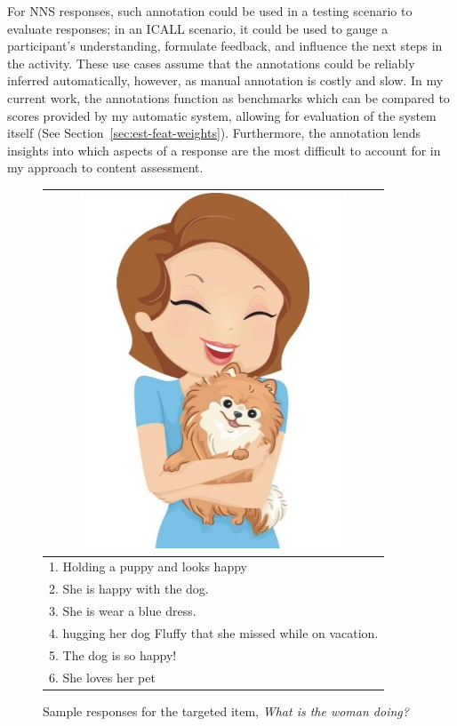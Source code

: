 For NNS responses, such annotation could be used in a testing scenario to evaluate responses; in an ICALL scenario, it could be used to gauge a participant's understanding, formulate feedback, and influence the next steps in the activity. These use cases assume that the annotations could be reliably inferred automatically, however, as manual annotation is costly and slow. In my current work, the annotations function as benchmarks which can be compared to scores provided by my automatic system, allowing for evaluation of the system itself (See Section~\ref{sec:est-feat-weights}). Furthermore, the annotation lends insights into which aspects of a response are the most difficult to account for in my approach to content assessment.

\begin{figure}[htb!]
\begin{center}
\begin{tabular}{|l|}
\hline
\multicolumn{1}{|c|}{\includegraphics[width=0.45\columnwidth]{figures/I29.jpg}} \\
\hline
1. Holding a puppy and looks happy \\
\hline
2. She is happy with the dog. \\
\hline
3. She is wear a blue dress. \\
\hline
4. hugging her dog Fluffy that she missed while on vacation. \\
\hline
5. The dog is so happy! \\
\hline
6. She loves her pet \\
\hline
\end{tabular}
\caption{\label{fig:sample-responses} Sample responses for the targeted item, \textit{What is the woman doing?}}
\end{center}
\end{figure}

